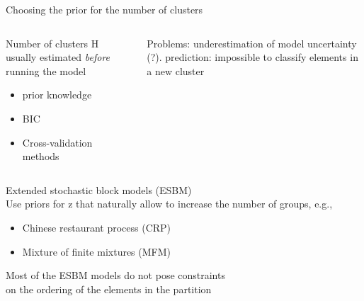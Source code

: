 














\begin{frame}{Choosing the prior for the number of clusters}

\begin{columns}

\begin{column}{0.5\textwidth} 

    Number of clusters H usually estimated \textit{before} running the model
    \begin{itemize}
        \item prior knowledge
        \item BIC
        \item Cross-validation methods
    \end{itemize}
\end{column}

\begin{column}{0.5\textwidth}
    Problems: underestimation of model uncertainty (?). prediction: impossible to classify elements in a new cluster
\end{column}
\end{columns}

\alert{Extended stochastic block models (ESBM)}\\  
Use priors for z that naturally allow to increase the number of groups, e.g., 
    \begin{itemize}
        \item Chinese restaurant process (CRP)
        \item Mixture of finite mixtures (MFM)
    \end{itemize}

Most of the ESBM models do not pose constraints\\ on the \alert{ordering of the elements} in the partition
\end{frame}








